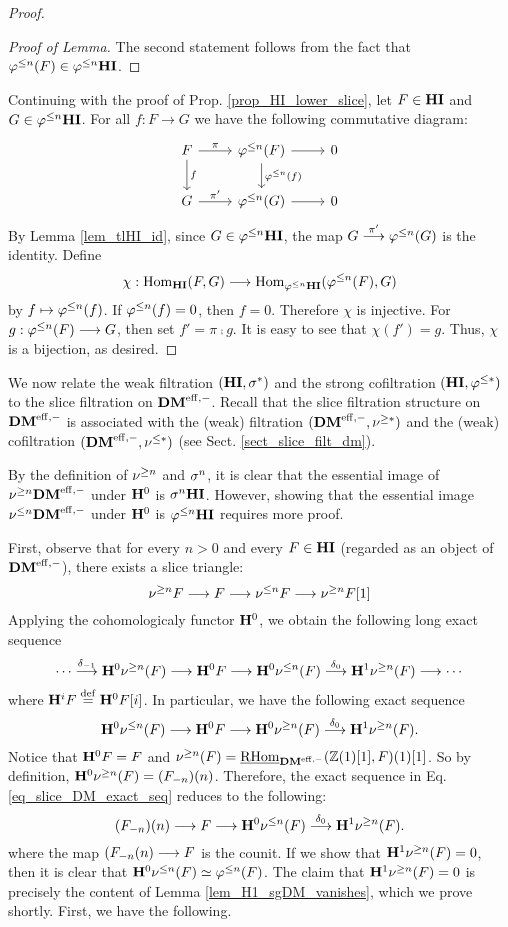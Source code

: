 \begin{proof}
\begin{proof}[Proof of Lemma]
The second statement follows from the fact that $\tlHI{n}(F) \in 
\tlHI{n}\HI$.
\end{proof}

Continuing with the proof of Prop. \ref{prop_HI_lower_slice}, let
$F \in \HI$ and $G \in \tlHI{n}\HI$. For all $f: F \to G$ we have 
the following commutative diagram:
\[
\begin{tikzcd}
F \arrow{r}{\pi} \arrow{d}{f}
& \tlHI{n}(F) \arrow{r} \arrow{d}{\tlHI{n}(f)}
& 0 \\
G \arrow{r}{\pi'}
& \tlHI{n}(G) \arrow{r}
& 0
\end{tikzcd}
\]
By Lemma \ref{lem_tlHI_id}, since $G \in \tlHI{n}\HI$, the map
$G \stackrel{\pi'}{\to} \tlHI{n}(G)$ is the identity. Define
\[
\chi : \homHI(F, G) \to \hom_{\tlHI{n}\HI}(\tlHI{n}(F), G)
\]
by $f \mapsto \tlHI{n}(f)$. If $\tlHI{n}(f) = 0$, then $f = 0$.
Therefore $\chi$ is injective. For $g: \tlHI{n}(F) \to G$, then
set $f' = \pi \comp g$. It is easy to see that $\chi(f') = g$.
Thus, $\chi$ is a bijection, as desired.
\end{proof}

We now relate the weak filtration $(\HI, \sgHI{*})$ and the strong 
cofiltration $(\HI, \tlHI{*})$ to the slice filtration on 
$\DMeff$. Recall that the slice filtration structure on $\DMeff$ 
is associated with the (weak) filtration $(\DMeff, \sgDM{*})$ and 
the (weak) cofiltration $(\DMeff, \slDM{*})$ (see Sect. 
\ref{sect_slice_filt_dm}).

By the definition of $\sgDM{n}$ and $\sgHI{n}$, it is clear that 
the essential image of $\sgDM{n}\DMeff$ under $\HH^0$ is 
$\sgHI{n}\HI$. However, showing that the essential image 
$\slDM{n}\DMeff$ under $\HH^0$ is $\tlHI{n}\HI$ requires more 
proof. 

First, observe that for every $n > 0$ and every $F \in \HI$ 
(regarded as an object of $\DMeff$), there exists a slice 
triangle:
\[
\sliceTriangle{n}{F}
\]
Applying the cohomologicaly functor $\HH^0$, we obtain the
following long exact sequence
\[
\cdots \stackrel{\delta_{-1}}{\to} \HH^0 \sgDM{n}(F) \to 
   \HH^0 F \to \HH^0 \slDM{n}(F)
   \stackrel{\delta_0}{\to} \HH^1 \sgDM{n}(F) \to \cdots
\]
where $\HH^i F \defeq \HH^0F[i]$. In particular, we
have the following exact sequence
\begin{equation}\label{eq_slice_DM_exact_seq}
\HH^0 \slDM{n}(F) \to \HH^0 F \to \HH^0 
\sgDM{n}(F) \stackrel{\delta_0}{\to} \HH^1 \sgDM{n}(F).
\end{equation}
Notice that $\HH^0F = F$ and $\sgDM{n}(F) = 
\ihomDMf(\Z(1)[1], F)(1)[1]$. So by definition, $\HH^0 \sgDM{n}(F) 
= \LHI[n]{(\RHI[n]{F})}$. Therefore, the exact sequence in Eq. 
\ref{eq_slice_DM_exact_seq} reduces to the following:
\[
\LHI[n]{(\RHI[n]{F})} \to F \to \HH^0{\slDM{n}(F)} 
   \stackrel{\delta_0}{\to} \HH^1 \sgDM{n}(F).
\]
where the map $\LHI[n]{(\RHI[n]{F}} \to F$ is the counit. If we 
show that $\HH^1 \sgDM{n}(F) = 0$, then it is clear that
$\HH^0 \slDM{n}(F) \simeq \tlHI{n}(F)$. The claim that 
$\HH^1 \sgDM{n}(F) = 0$ is precisely the content of Lemma 
\ref{lem_H1_sgDM_vanishes}, which we prove shortly. First, we have
the following.

